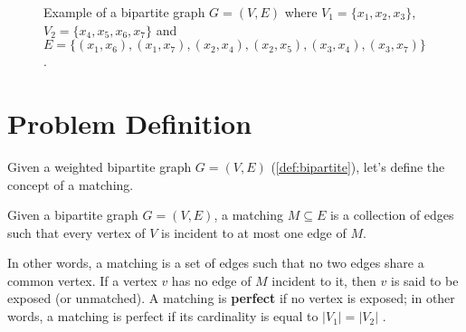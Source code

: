 \begin{figure}[H]
    \centering
    \caption[Example of a bipartite graph]{Example of a bipartite graph $G=(V, E)$ where $V_1=\{x_1,x_2,x_3\}$, $V_2=\{x_4,x_5,x_6,x_7\}$ and $E=\{(x_1,x_6),(x_1,x_7),(x_2,x_4),(x_2,x_5),(x_3,x_4),(x_3,x_7)\}$.}
    \label{fig:bipartite_graph_example}
\end{figure}


\section{Problem Definition}
Given a weighted bipartite graph $G = (V, E)$ (\cref{def:bipartite}), let's define the concept of a matching. 

\begin{definition}[Matching] \label{def:matching}
    Given a bipartite graph $G = (V, E)$, a matching $M \subseteq E$ is a collection of edges such that every vertex of $V$ is incident to at most one edge of $M$.
\end{definition}

In other words, a matching is a set of edges such that no two edges share a common vertex. If a vertex $v$ has no edge of $M$ incident to it, then $v$ is said to be exposed (or unmatched). A matching is \textbf{perfect} if no vertex is exposed; in other words, a matching is perfect if its cardinality is equal to $|V_1| = |V_2|$ \cite{goemans2009matching}.

